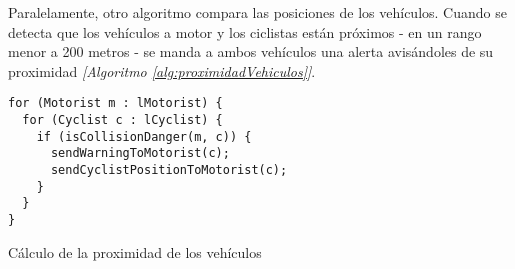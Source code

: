Paralelamente, otro algoritmo compara las posiciones de los vehículos. Cuando se detecta que los vehículos a motor y los ciclistas están próximos - en un rango menor a 200 metros - se manda a ambos vehículos una alerta avisándoles de su proximidad \emph{[Algoritmo \ref{alg:proximidadVehiculos}]}.

\begin{listing}
	\begin{minipage}{.4\textwidth}
		\begin{verbatim}
for (Motorist m : lMotorist) {
  for (Cyclist c : lCyclist) {
    if (isCollisionDanger(m, c)) {
      sendWarningToMotorist(c);
      sendCyclistPositionToMotorist(c);
    }
  }
}
		\end{verbatim}
	\end{minipage}
	\caption{Cálculo de la proximidad de los vehículos}\label{alg:proximidadVehiculos}
\end{listing}
